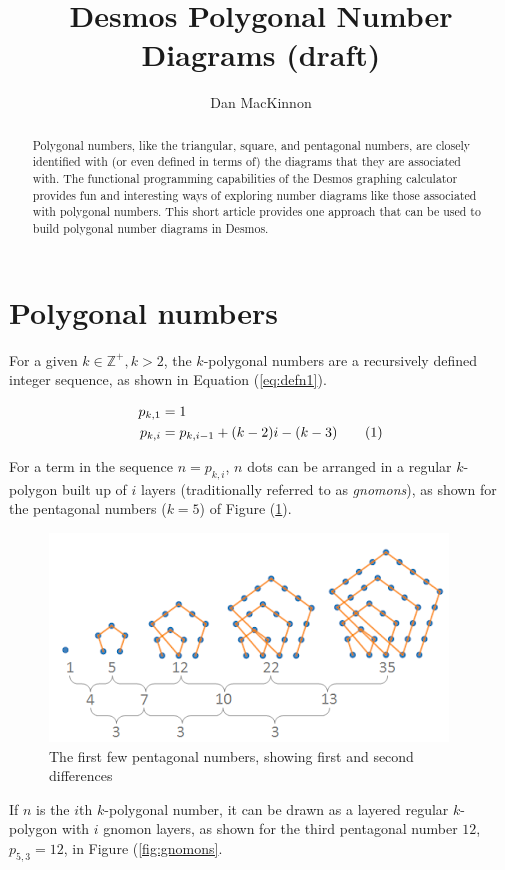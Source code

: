 \documentclass[notitlepage]{report}
\title{Desmos Polygonal Number Diagrams (draft)}
\author{Dan MacKinnon}
\newcommand\numberthis{\addtocounter{equation}{1}\tag{\theequation}}
\begin{document}
\maketitle
\begin{abstract}
\noindent
Polygonal numbers, like the triangular, square, and pentagonal numbers, are closely identified with (or even defined in terms of) the diagrams that they are associated with. The functional programming capabilities of the Desmos graphing calculator provides fun and interesting ways of exploring number diagrams like those associated with polygonal numbers. This short article provides one approach that can be used to build polygonal number diagrams in Desmos.  
\end{abstract}

\section*{Polygonal numbers}
For a given $k \in \mathbb{Z}^+, k>2$, the $k$-polygonal numbers are a recursively defined integer sequence, as shown in Equation (\ref{eq:defn1}). 

\begin{align*}
    p_{k, 1} &= 1 \\
    p_{k,i} &= p_{k,i-1} + (k-2)i - (k-3)
    \numberthis
    \label{eq:defn1}
\end{align*}

For a term in the sequence $n = p_{k,i}$, $n$ dots can be arranged in a regular $k$-polygon built up of $i$ layers (traditionally referred to as \textit{gnomons}), as shown for the pentagonal numbers ($k=5$) of Figure (\ref{fig:pentagonals}). 

\begin{figure}[!htb]
    \centering
    \includegraphics[width=0.5\linewidth]{pentagonal_numbers.PNG}
    \caption{The first few pentagonal numbers, showing first and second differences}
    \label{fig:pentagonals}
\end{figure}

If $n$ is the $i$th $k$-polygonal number, it can be drawn as a layered regular $k$-polygon with $i$ gnomon layers, as shown for the third pentagonal number $12$, $p_{5,3}=12$, in Figure (\ref{fig:gnomons}.
\end{document}
